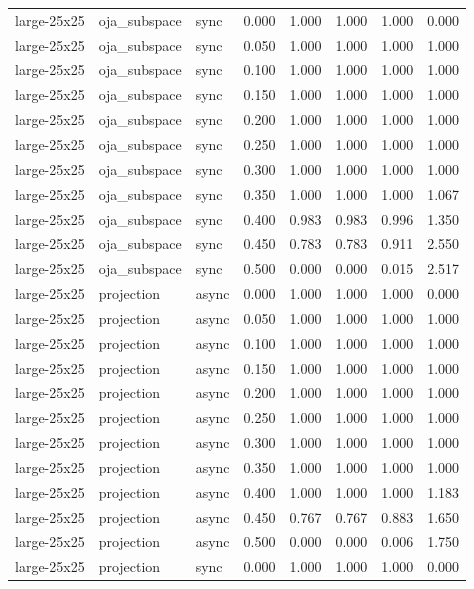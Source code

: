 \begin{tabular}{lllrrrrr}
large-25x25 & oja\_subspace & sync & 0.000 & 1.000 & 1.000 & 1.000 & 0.000 \\
large-25x25 & oja\_subspace & sync & 0.050 & 1.000 & 1.000 & 1.000 & 1.000 \\
large-25x25 & oja\_subspace & sync & 0.100 & 1.000 & 1.000 & 1.000 & 1.000 \\
large-25x25 & oja\_subspace & sync & 0.150 & 1.000 & 1.000 & 1.000 & 1.000 \\
large-25x25 & oja\_subspace & sync & 0.200 & 1.000 & 1.000 & 1.000 & 1.000 \\
large-25x25 & oja\_subspace & sync & 0.250 & 1.000 & 1.000 & 1.000 & 1.000 \\
large-25x25 & oja\_subspace & sync & 0.300 & 1.000 & 1.000 & 1.000 & 1.000 \\
large-25x25 & oja\_subspace & sync & 0.350 & 1.000 & 1.000 & 1.000 & 1.067 \\
large-25x25 & oja\_subspace & sync & 0.400 & 0.983 & 0.983 & 0.996 & 1.350 \\
large-25x25 & oja\_subspace & sync & 0.450 & 0.783 & 0.783 & 0.911 & 2.550 \\
large-25x25 & oja\_subspace & sync & 0.500 & 0.000 & 0.000 & 0.015 & 2.517 \\
large-25x25 & projection & async & 0.000 & 1.000 & 1.000 & 1.000 & 0.000 \\
large-25x25 & projection & async & 0.050 & 1.000 & 1.000 & 1.000 & 1.000 \\
large-25x25 & projection & async & 0.100 & 1.000 & 1.000 & 1.000 & 1.000 \\
large-25x25 & projection & async & 0.150 & 1.000 & 1.000 & 1.000 & 1.000 \\
large-25x25 & projection & async & 0.200 & 1.000 & 1.000 & 1.000 & 1.000 \\
large-25x25 & projection & async & 0.250 & 1.000 & 1.000 & 1.000 & 1.000 \\
large-25x25 & projection & async & 0.300 & 1.000 & 1.000 & 1.000 & 1.000 \\
large-25x25 & projection & async & 0.350 & 1.000 & 1.000 & 1.000 & 1.000 \\
large-25x25 & projection & async & 0.400 & 1.000 & 1.000 & 1.000 & 1.183 \\
large-25x25 & projection & async & 0.450 & 0.767 & 0.767 & 0.883 & 1.650 \\
large-25x25 & projection & async & 0.500 & 0.000 & 0.000 & 0.006 & 1.750 \\
large-25x25 & projection & sync & 0.000 & 1.000 & 1.000 & 1.000 & 0.000 \\

\end{tabular}
